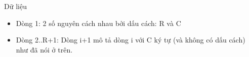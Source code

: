 Dữ liệu
\begin{itemize}
	\item     Dòng 1: 2 số nguyên cách nhau bởi dấu cách: R và C   
	\item     Dòng 2..R+1: Dòng i+1 mô tả dòng i với C ký tự (và không có dấu          cách) như đã nói ở trên.   
\end{itemize}